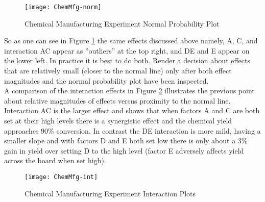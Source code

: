 \begin{figure}[h]\caption{Chemical Manufacturing Experiment Normal Probability Plot}\label{fig11}
\begin{center}
\texttt{[image: ChemMfg-norm]}
\end{center}
\end{figure}

So as one can see in Figure \ref{fig11} the same effects discussed above namely, A, C, and interaction AC appear as ''outliers'' at the top right, and DE and E appear on the lower left.  In practice it is best to do both. Render a decision about effects that are relatively small (closer to the normal line) only after both effect magnitudes and the normal probability plot have been inspected.\\


A comparison of the interaction effects in Figure \ref{fig12} illustrates the previous point about relative magnitudes of effects versus proximity to the normal line.  Interaction AC is the larger effect and shows that when factors A and C are both set at their high levels there is a synergistic effect and the chemical yield approaches 90\% conversion.  In contrast the DE interaction is more mild, having a smaller slope and with factors D and E both set low there is only about a 3\% gain in yield over setting D to the high level (factor E adversely affects yield across the board when set high).

\begin{figure}[h]\caption{Chemical Manufacturing Experiment Interaction Plots}\label{fig12}
\begin{center}
\texttt{[image: ChemMfg-int]}
\end{center}
\end{figure}



